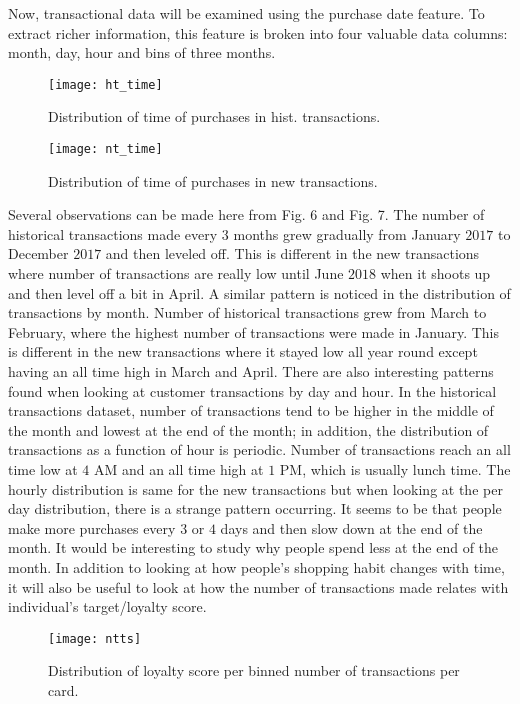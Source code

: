 \documentclass[journal, a4paper]{IEEEtran}
\begin{document}
Now, transactional data will be examined using the purchase date feature. To extract richer information, this feature is broken into four valuable data columns: month, day, hour and bins of three months. 
 \begin{figure}[b!] \texttt{[image: ht\_time]} \caption{Distribution of time of purchases in hist. transactions.} \end{figure} 
 \begin{figure}[b!] \texttt{[image: nt\_time]} \caption{Distribution of time of purchases in new transactions.} \end{figure} 
Several observations can be made here from Fig. 6 and Fig. 7. The number of historical transactions made every $3$ months grew gradually from January $2017$ to December $2017$ and then leveled off. This is different in the new transactions where number of transactions are really low until June $2018$ when it shoots up and then level off a bit in April. A similar pattern is noticed in the distribution of transactions by month. Number of historical transactions grew from March to February, where the highest number of transactions were made in January. This is different in the new transactions where it stayed low all year round except having an all time high in March and April. There are also interesting patterns found when looking at customer transactions by day and hour. In the historical transactions dataset, number of transactions tend to be higher in the middle of the month and lowest at the end of the month; in addition, the distribution of transactions as a function of hour is periodic. Number of transactions reach an all time low at $4$ AM and an all time high at $1$ PM, which is usually lunch time. The hourly distribution is same for the new transactions but when looking at the per day distribution, there is a strange pattern occurring. It seems to be that people make more purchases every $3$ or $4$ days and then slow down at the end of the month. It would be interesting to study why people spend less at the end of the month. In addition to looking at how people's shopping habit changes with time, it will also be useful to look at how the number of transactions made relates with individual's target/loyalty score. 
 \begin{figure}[t!] \texttt{[image: ntts]} \caption{Distribution of loyalty score per binned number of transactions per card.} \end{figure} 
\end{document}
